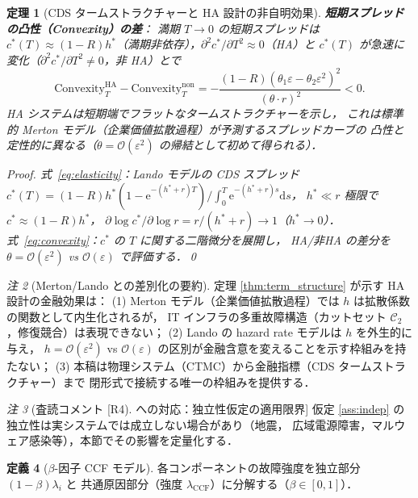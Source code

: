 \documentclass[12pt,a4paper]{article}
\theoremstyle{plain}
\newtheorem{theorem}{定理}[section]
\theoremstyle{definition}
\newtheorem{definition}[theorem]{定義}
\theoremstyle{remark}
\newtheorem{remark}[theorem]{注}
\newcommand{\calO}{\mathcal{O}}
\newcommand{\eps}{\varepsilon}
\newcommand{\e}{\mathrm{e}}
\newcommand{\dd}{\mathrm{d}}
\newcommand{\calCtwo}{\mathcal{C}_2}
\begin{document}
\begin{theorem}[CDS タームストラクチャーと HA 設計の非自明効果]
  \textbf{短期スプレッドの凸性（Convexity）の差}：
  満期 $T\to0$ の短期スプレッドは
  $c^*(T)\approx(1-R)h^*$（満期非依存），$\partial^2 c^*/\partial T^2\approx0$（HA）と
  $c^*(T)$ が急速に変化（$\partial^2 c^*/\partial T^2 \ne 0$，非 HA）とで
  \begin{equation}\label{eq:convexity}
    \mathrm{Convexity}^{\mathrm{HA}}_T - \mathrm{Convexity}^{\mathrm{non}}_T
    = -\frac{(1-R)(\theta_1\eps - \theta_2\eps^2)^2}{(\theta\cdot r)^2} < 0.
  \end{equation}
  HA システムは短期端でフラットなタームストラクチャーを示し，
  これは標準的 Merton モデル（企業価値拡散過程）が予測するスプレッドカーブの
  凸性と定性的に異なる（$\theta = \calO(\eps^2)$ の帰結として初めて得られる）．

  \begin{proof}
    式~\eqref{eq:elasticity}：Lando モデルの CDS スプレッド
    $c^*(T) = (1-R)h^*(1-\e^{-(h^*+r)T})/\int_0^T\e^{-(h^*+r)s}\dd s$，
    $h^*\ll r$ 極限で $c^*\approx(1-R)h^*$，
    $\partial\log c^*/\partial\log r = r/(h^*+r)\to 1$（$h^*\to0$）．
    式~\eqref{eq:convexity}：$c^*$ の $T$ に関する二階微分を展開し，
    HA/非HA の差分を $\theta = \calO(\eps^2)$ vs $\calO(\eps)$ で評価する．\qed
  \end{proof}
\end{theorem}

\begin{remark}[Merton/Lando との差別化の要約]
  定理 \ref{thm:term_structure} が示す HA 設計の金融効果は：
  (1) Merton モデル（企業価値拡散過程）では $h$ は拡散係数の関数として内生化されるが，
  IT インフラの多重故障構造（カットセット $\calCtwo$，修復競合）は表現できない；
  (2) Lando の hazard rate モデルは $h$ を外生的に与え，
  $h = \calO(\eps^2)$ vs $\calO(\eps)$ の区別が金融含意を変えることを示す枠組みを持たない；
  (3) 本稿は物理システム（CTMC）から金融指標（CDS タームストラクチャー）まで
  閉形式で接続する唯一の枠組みを提供する．
\end{remark}

\begin{remark}[査読コメント [R4] への対応：独立性仮定の適用限界]
  仮定 \ref{ass:indep} の独立性は実システムでは成立しない場合があり（地震，
  広域電源障害，マルウェア感染等），本節でその影響を定量化する．
\end{remark}

\begin{definition}[$\beta$-因子 CCF モデル]\label{def:ccf}
  各コンポーネントの故障強度を独立部分 $(1-\beta)\lambda_i$ と
  共通原因部分（強度 $\lambda_{\mathrm{CCF}}$）に分解する（$\beta\in[0,1]$）．
\end{definition}
\end{document}
